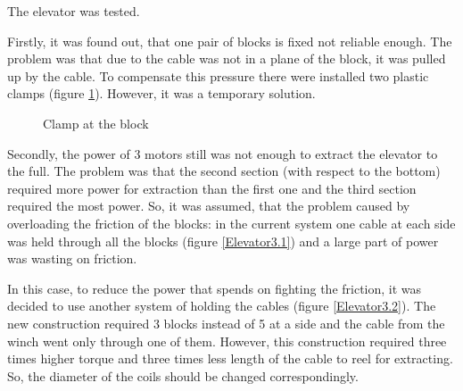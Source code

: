 The elevator was tested. 

Firstly, it was found out, that one pair of blocks is fixed not reliable enough. The problem was that due to the cable was not in a plane of the block, it was pulled up by the cable. To compensate this pressure there were installed two plastic clamps (figure \ref{Elevator2.6}). However, it was a temporary solution.

\begin{figure}[H]
	\begin{minipage}[h]{1\linewidth}
		\caption{Clamp at the block}
		\label{Elevator2.6}
	\end{minipage}
\end{figure}

Secondly, the power of 3 motors still was not enough to extract the elevator to the full. The problem was that the second section (with respect to the bottom) required more power for extraction than the first one and the third section required the most power. So, it was assumed, that the problem caused by overloading the friction of the blocks: in the current system one cable at each side was held through all the blocks (figure \ref{Elevator3.1}) and a large part of power was wasting on friction. 

In this case, to reduce the power that spends on fighting the friction, it was decided to use another system of holding the cables (figure \ref{Elevator3.2}). The new construction required 3 blocks instead of 5 at a side and the cable from the winch went only through one of them. However, this construction required three times higher torque and three times less length of the cable to reel for extracting. So, the diameter of the coils should be changed correspondingly.

